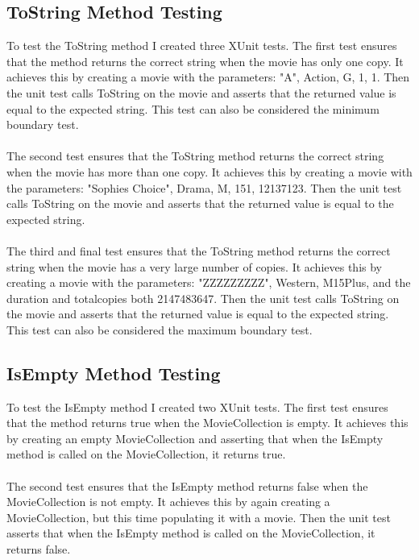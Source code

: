 \documentclass[12pt,a4paper]{article}
\begin{document}
		\subsection{ToString Method Testing}
			To test the ToString method I created three XUnit tests. The first test 
			ensures that the method returns the correct string when the movie has 
			only one copy. It achieves this by creating a movie with the parameters: 
			"A", Action, G, 1, 1. Then the unit test calls ToString on the movie and 
			asserts that the returned value is equal to the expected string. This test 
			can also be considered the minimum boundary test.\\
			\\
			The second test ensures that the ToString method returns the correct 
			string when the movie has more than one copy. It achieves this by creating 
			a movie with the parameters: "Sophies Choice", Drama, M, 151, 12137123. 
			Then the unit test calls ToString on the movie and asserts that the returned 
			value is equal to the expected string.\\
			\\
			The third and final test ensures that the ToString method returns the 
			correct string when the movie has a very large number of copies. It 
			achieves this by creating a movie with the parameters: "ZZZZZZZZZ", 
			Western, M15Plus, and the duration and totalcopies both 2147483647. 
			Then the unit test calls ToString on the movie and asserts that the 
			returned value is equal to the expected string. This test can also 
			be considered the maximum boundary test.\\

		\subsection{IsEmpty Method Testing}
			To test the IsEmpty method I created two XUnit tests. The first test 
			ensures that the method returns true when the MovieCollection is empty. 
			It achieves this by creating an empty MovieCollection and asserting that 
			when the IsEmpty method is called on the MovieCollection, it returns 
			true.\\
			\\
			The second test ensures that the IsEmpty method returns false when the 
			MovieCollection is not empty. It achieves this by again creating a 
			MovieCollection, but this time populating it with a movie. Then	the 
			unit test asserts that when the IsEmpty method is called on the 
			MovieCollection, it returns false.\\
		
\end{document}
